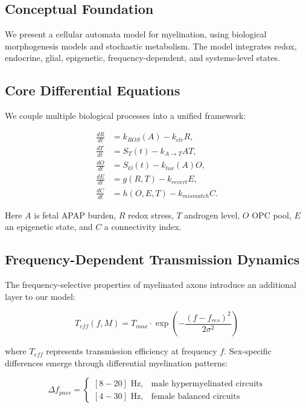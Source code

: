 \documentclass[12pt]{article}
\begin{document}
\subsection{Conceptual Foundation}
We present a cellular automata model for myelination, using biological morphogenesis models and stochastic metabolism. The model integrates redox, endocrine, glial, epigenetic, frequency-dependent, and systems-level states.

\subsection{Core Differential Equations}
We couple multiple biological processes into a unified framework:

\begin{align}
\frac{dR}{dt} &= k_{ROS}(A) - k_{clr}R, \\
\frac{dT}{dt} &= S_T(t) - k_{A \rightarrow T}AT, \\
\frac{dO}{dt} &= S_O(t) - k_{tox}(A)O, \\
\frac{dE}{dt} &= g(R,T) - k_{revert}E, \\
\frac{dC}{dt} &= h(O,E,T) - k_{mismatch}C.
\end{align}

Here $A$ is fetal APAP burden, $R$ redox stress, $T$ androgen level, $O$ OPC pool, $E$ an epigenetic state, and $C$ a connectivity index.

\subsection{Frequency-Dependent Transmission Dynamics}
The frequency-selective properties of myelinated axons introduce an additional layer to our model:

\begin{equation}
T_{eff}(f,M) = T_{max} \cdot \exp\left(-\frac{(f-f_{res})^2}{2\sigma^2}\right)
\end{equation}

where $T_{eff}$ represents transmission efficiency at frequency $f$. Sex-specific differences emerge through differential myelination patterns:

\begin{equation}
\Delta f_{pass} = \begin{cases}
[8-20] \text{ Hz}, & \text{male hypermyelinated circuits} \\
[4-30] \text{ Hz}, & \text{female balanced circuits}
\end{cases}
\end{equation}
\end{document}
